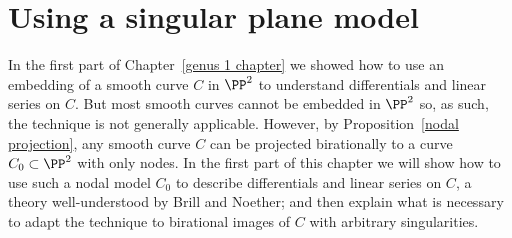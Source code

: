 

\def\adj{{\mathfrak F}}
\chapter{Using a singular plane model}
\label{PlaneCurvesChapter}

In the first part of Chapter~\ref{genus 1 chapter} we showed how to use an embedding of a smooth curve $C$
in $\PP^2$ to understand differentials and linear series on $C$. But most smooth curves cannot be embedded in
$\PP^2$ so, as such, the technique is not generally applicable. However, by Proposition~\ref{nodal projection},
 any smooth curve $C$ can be projected 
birationally to a curve $C_0\subset\PP^2$ with only nodes. In the first part of this chapter we will show
how to use such a nodal model $C_0$ to describe differentials and linear series on $C$, a theory well-understood
by Brill and Noether;  and then explain
what is necessary to adapt the technique to birational images of $C$ with arbitrary singularities.

